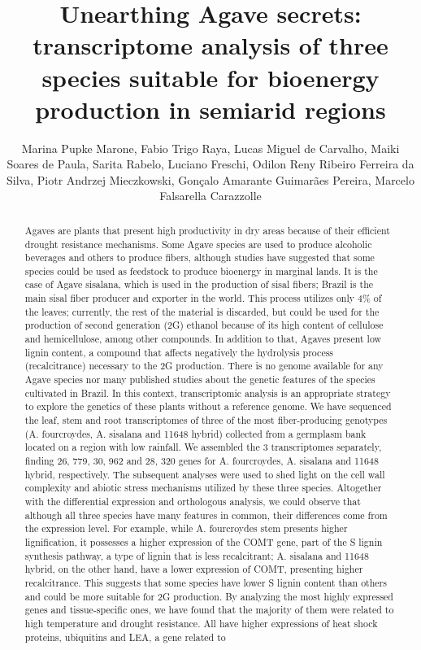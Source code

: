 \documentclass[twoside]{article}
\title{\vspace{-15mm}\fontsize{24pt}{10pt}\selectfont\textbf{ Unearthing Agave secrets: transcriptome analysis of three species suitable for bioenergy production in semiarid regions }} %
\author{ Marina Pupke Marone, Fabio Trigo Raya, Lucas Miguel de Carvalho, Maiki Soares de Paula, Sarita Rabelo, Luciano Freschi, Odilon Reny Ribeiro Ferreira da Silva, Piotr Andrzej Mieczkowski, Gon\c{c}alo Amarante Guimar\~aes Pereira, Marcelo Falsarella Carazzolle }
\affil{ USP }
\date{}
\begin{document}
  
  
  \maketitle %
  
  
  \thispagestyle{fancy} %
  
  
  \begin{abstract}
  Agaves are plants that present high productivity in dry areas because of their efficient drought resistance mechanisms. Some Agave species are used to produce alcoholic beverages and others to produce fibers,  although studies have suggested that some species could be used as feedstock to produce bioenergy in marginal lands. It is the case of Agave sisalana,  which is used in the production of sisal fibers; Brazil is the main sisal fiber producer and exporter in the world. This process utilizes only 4\% of the leaves; currently,  the rest of the material is discarded,  but could be used for the production of second generation (2G) ethanol because of its high content of cellulose and hemicellulose,  among other compounds. In addition to that,  Agaves present low lignin content,  a compound that affects negatively the hydrolysis process (recalcitrance) necessary to the 2G production.  There is no genome available for any Agave species nor many published studies about the genetic features of the species cultivated in Brazil. In this context,  transcriptomic analysis is an appropriate strategy to explore the genetics of these plants without a reference genome. We have sequenced the leaf,  stem and root transcriptomes of three of the most fiber-producing genotypes (A. fourcroydes,  A. sisalana and 11648 hybrid) collected from a germplasm bank located on a region with low rainfall. We assembled the 3 transcriptomes separately,  finding 26, 779,  30, 962 and 28, 320 genes for A. fourcroydes,  A. sisalana and 11648 hybrid,  respectively.  The subsequent analyses were used to shed light on the cell wall complexity and abiotic stress mechanisms utilized by these three species. Altogether with the differential expression and orthologous analysis,  we could observe that although all three species have many features in common,  their differences come from the expression level. For example,  while A. fourcroydes stem presents higher lignification,  it possesses a higher expression of the COMT gene,  part of the S lignin synthesis pathway,  a type of lignin that is less recalcitrant; A. sisalana and 11648 hybrid,  on the other hand,  have a lower expression of COMT,  presenting higher recalcitrance. This suggests that some species have lower S lignin content than others and could be more suitable for 2G production.  By analyzing the most highly expressed genes and tissue-specific ones,  we have found that the majority of them were related to high temperature and drought resistance. All have higher expressions of heat shock proteins,  ubiquitins and LEA,  a gene related to 
\end{abstract}
\end{document}
